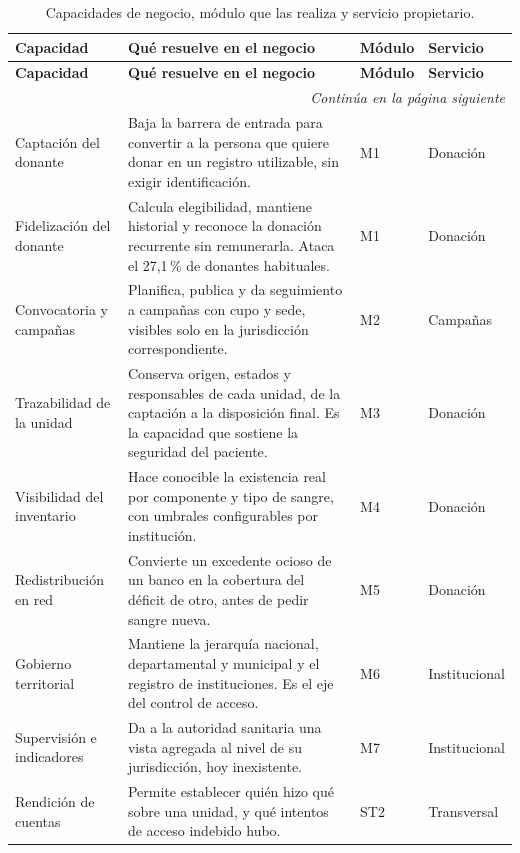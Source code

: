 \documentclass[11pt,a4paper]{article}
\newcommand{\contlinea}[1]{\multicolumn{#1}{r}{\footnotesize\itshape Continúa en la página siguiente}}
\begin{document}
\begin{longtable}{L{3.2cm} L{5.4cm} L{2.4cm} L{2.8cm}}
\caption{Capacidades de negocio, módulo que las realiza y servicio propietario.}\label{tab:capacidades}\\
\toprule
\textbf{Capacidad} & \textbf{Qué resuelve en el negocio} & \textbf{Módulo} & \textbf{Servicio} \\
\midrule
\endfirsthead
\toprule
\textbf{Capacidad} & \textbf{Qué resuelve en el negocio} & \textbf{Módulo} & \textbf{Servicio} \\
\midrule
\endhead
\midrule
\contlinea{4} \\
\endfoot
\bottomrule
\endlastfoot
Captación del donante & Baja la barrera de entrada para convertir a la persona que quiere donar en un registro utilizable, sin exigir identificación. & M1 & Donación \\
Fidelización del donante & Calcula elegibilidad, mantiene historial y reconoce la donación recurrente sin remunerarla. Ataca el 27,1\,\% de donantes habituales. & M1 & Donación \\
Convocatoria y campañas & Planifica, publica y da seguimiento a campañas con cupo y sede, visibles solo en la jurisdicción correspondiente. & M2 & Campañas \\
Trazabilidad de la unidad & Conserva origen, estados y responsables de cada unidad, de la captación a la disposición final. Es la capacidad que sostiene la seguridad del paciente. & M3 & Donación \\
Visibilidad del inventario & Hace conocible la existencia real por componente y tipo de sangre, con umbrales configurables por institución. & M4 & Donación \\
Redistribución en red & Convierte un excedente ocioso de un banco en la cobertura del déficit de otro, antes de pedir sangre nueva. & M5 & Donación \\
Gobierno territorial & Mantiene la jerarquía nacional, departamental y municipal y el registro de instituciones. Es el eje del control de acceso. & M6 & Institucional \\
Supervisión e indicadores & Da a la autoridad sanitaria una vista agregada al nivel de su jurisdicción, hoy inexistente. & M7 & Institucional \\
Rendición de cuentas & Permite establecer quién hizo qué sobre una unidad, y qué intentos de acceso indebido hubo. & ST2 & Transversal \\
\end{longtable}
\end{document}
